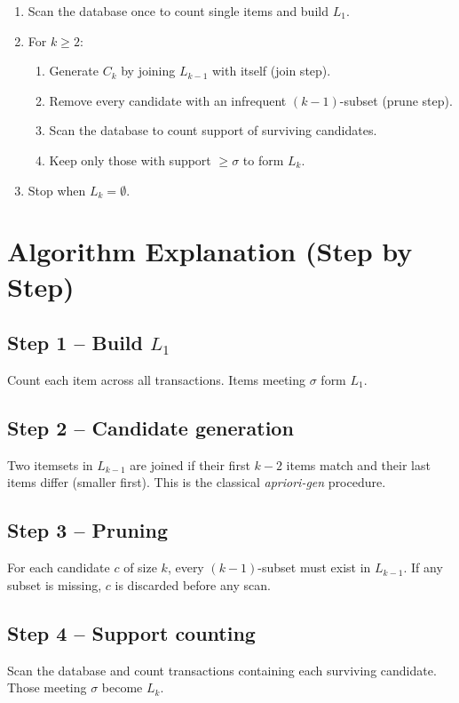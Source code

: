 \documentclass[11pt,a4paper]{article}
\begin{document}
\begin{enumerate}[leftmargin=1.4em]
  \item Scan the database once to count single items and build $L_1$.
  \item For $k \geq 2$:
    \begin{enumerate}
      \item Generate $C_k$ by joining $L_{k-1}$ with itself (join step).
      \item Remove every candidate with an infrequent $(k-1)$-subset
            (prune step).
      \item Scan the database to count support of surviving candidates.
      \item Keep only those with support $\geq \sigma$ to form $L_k$.
    \end{enumerate}
  \item Stop when $L_k = \emptyset$.
\end{enumerate}

\section{Algorithm Explanation (Step by Step)}

\subsection{Step 1 -- Build $L_1$}
Count each item across all transactions. Items meeting $\sigma$ form $L_1$.

\subsection{Step 2 -- Candidate generation}
Two itemsets in $L_{k-1}$ are joined if their first $k-2$ items match and
their last items differ (smaller first). This is the classical
\emph{apriori-gen} procedure.

\subsection{Step 3 -- Pruning}
For each candidate $c$ of size $k$, every $(k-1)$-subset must exist in
$L_{k-1}$. If any subset is missing, $c$ is discarded before any scan.

\subsection{Step 4 -- Support counting}
Scan the database and count transactions containing each surviving
candidate. Those meeting $\sigma$ become $L_k$.
\end{document}
